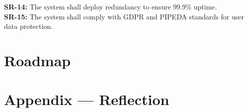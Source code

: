 \documentclass{article}
\begin{document}
\noindent \textbf{SR-14:} The system shall deploy redundancy to ensure 99.9\% uptime. \\

\noindent \textbf{SR-15:} The system shall comply with GDPR and PIPEDA standards for user data protection. \\

\section{Roadmap}


\newpage{}

\section*{Appendix --- Reflection}



\end{document}
